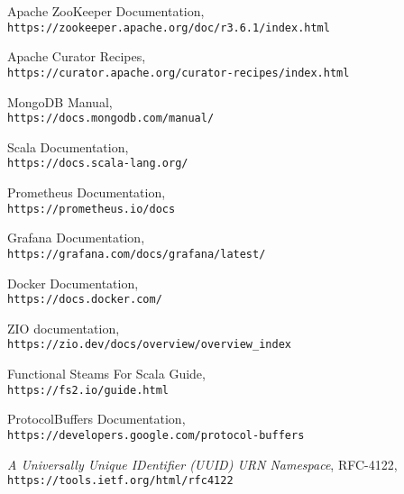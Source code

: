 \documentclass[14pt]{article}
\begin{document}
\begin{thebibliography}{9}
Apache ZooKeeper Documentation,\\
\texttt{https://zookeeper.apache.org/doc/r3.6.1/index.html}

Apache Curator Recipes,\\
\texttt{https://curator.apache.org/curator-recipes/index.html}

MongoDB Manual,\\
\texttt{https://docs.mongodb.com/manual/}

Scala Documentation,\\
\texttt{https://docs.scala-lang.org/}

Prometheus Documentation,\\
\texttt{https://prometheus.io/docs}

Grafana Documentation,\\
\texttt{https://grafana.com/docs/grafana/latest/}

Docker Documentation,\\
\texttt{https://docs.docker.com/}

ZIO documentation,\\
\texttt{https://zio.dev/docs/overview/overview\_index}

Functional Steams For Scala Guide,\\
\texttt{https://fs2.io/guide.html}

ProtocolBuffers Documentation,\\
\texttt{https://developers.google.com/protocol-buffers}

\textit{A Universally Unique IDentifier (UUID) URN Namespace},
RFC-4122,\\
\texttt{https://tools.ietf.org/html/rfc4122}

\end{thebibliography}
\end{document}
